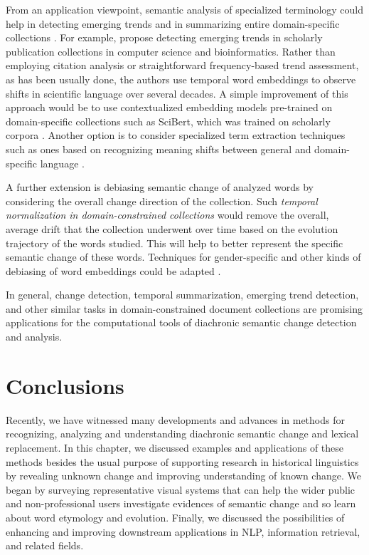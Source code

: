 \documentclass[output=paper%
]{langsci/langscibook}
\begin{document}
From an application viewpoint, semantic analysis of specialized terminology could help in detecting emerging trends \citep{dridi2019leap2trend} and in summarizing entire domain-specific collections \citep{syafiq}.
For example, \citet{dridi2019leap2trend} propose detecting emerging trends in scholarly publication collections in  computer science and bioinformatics. Rather than employing citation analysis or straightforward frequency-based trend assessment, as  has been usually done, the authors use temporal word embeddings to observe shifts in scientific language over several decades. A simple improvement of this approach would be to use contextualized embedding models pre-trained on domain-specific collections such as SciBert, which was trained on scholarly corpora \citep{beltagy2019scibert}. Another option is to consider specialized term extraction techniques such as ones based on recognizing meaning shifts between general and domain-specific language \citep{hatty2019surel}. 

A further extension is debiasing semantic change of analyzed words by considering the overall change direction of the collection. Such \emph{temporal normalization in domain-constrained collections} would remove the overall, average drift that the collection underwent over time based on the evolution trajectory of the words studied. This will help to better represent the specific semantic change of these words. Techniques for gender-specific and other kinds of debiasing of word embeddings could be adapted \citep{bolukbasi2016man, kaneko2019gender}. 

\begin{sloppypar}
In general, change detection, temporal summarization, emerging trend detection, and other similar tasks in  domain-constrained document collections are promising applications for the computational tools of diachronic semantic change detection and analysis.
\end{sloppypar}


\section{Conclusions}
Recently, we have witnessed many developments and advances in methods for recognizing, analyzing and understanding diachronic semantic change and lexical replacement. In this chapter, we discussed examples and applications of these methods besides the usual purpose of supporting research in historical linguistics by revealing unknown change and improving understanding of known change. 
We began by surveying representative visual systems that can help the wider public and non-professional users investigate evidences of semantic change and so  learn about word etymology and evolution. Finally, we discussed the possibilities of enhancing and improving downstream applications in NLP, information retrieval, and related fields.
\end{document}
